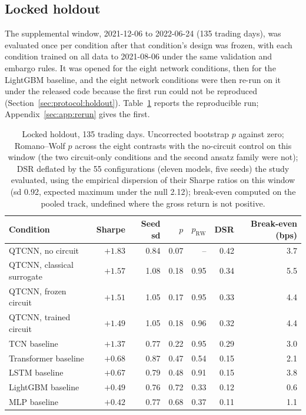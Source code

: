 \subsection{Locked holdout}
\label{sec:results:holdout}

The supplemental window, 2021-12-06 to 2022-06-24 (\num{135} trading days),
was evaluated once per condition after that condition's design was frozen,
with each condition trained on all data to 2021-08-06 under the same validation
and embargo rules. It was opened for the eight network conditions, then for
the LightGBM baseline, and the eight network conditions were then re-run on it
under the released code because the first run could not be reproduced
(Section~\ref{sec:protocol:holdout}). Table~\ref{tab:holdout} reports the
reproducible run; Appendix~\ref{sec:app:rerun} gives the first.

\begin{table}[t]
\centering
\caption{Locked holdout, 135 trading days. Uncorrected
bootstrap $p$ against zero; Romano--Wolf $p$ across the eight contrasts with
the no-circuit control on this window (the two circuit-only
conditions and the second ansatz family were not); DSR deflated by the
\num{55} configurations (eleven models, five seeds) the study evaluated, using the
empirical dispersion of their Sharpe ratios on this window (sd \num{0.92},
expected maximum under the null \num{2.12}); break-even computed on the
pooled track, undefined where the gross return is not positive.}
\label{tab:holdout}
\small
\begin{tabular}{lrrrrrr}
\toprule
Condition & Sharpe & Seed sd & $p$ & $p_{\mathrm{RW}}$ & DSR & Break-even (bps) \\
\midrule
QTCNN, no circuit          & $+1.83$ & 0.84 & 0.07 & --   & 0.42 & 3.7 \\
QTCNN, classical surrogate & $+1.57$ & 1.08 & 0.18 & 0.95 & 0.34 & 5.5 \\
QTCNN, frozen circuit      & $+1.51$ & 1.05 & 0.17 & 0.95 & 0.33 & 4.4 \\
QTCNN, trained circuit     & $+1.49$ & 1.05 & 0.18 & 0.96 & 0.32 & 4.4 \\
TCN baseline               & $+1.37$ & 0.77 & 0.22 & 0.95 & 0.29 & 3.0 \\
Transformer baseline       & $+0.68$ & 0.87 & 0.47 & 0.54 & 0.15 & 2.1 \\
LSTM baseline              & $+0.67$ & 0.79 & 0.48 & 0.91 & 0.15 & 3.8 \\
LightGBM baseline          & $+0.49$ & 0.76 & 0.72 & 0.33 & 0.12 & 0.6 \\
MLP baseline               & $+0.42$ & 0.77 & 0.68 & 0.37 & 0.11 & 1.1 \\
\bottomrule
\end{tabular}
\end{table}

